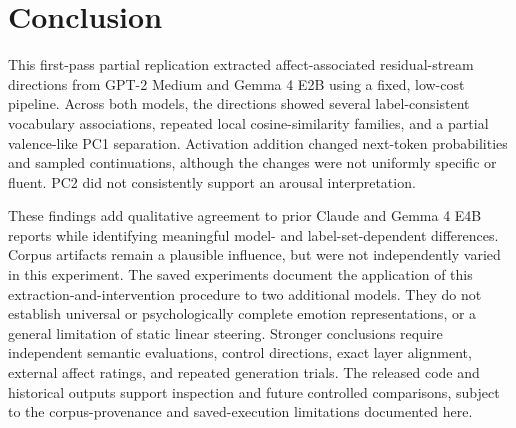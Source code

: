 \section{Conclusion}

This first-pass partial replication extracted affect-associated residual-stream directions from GPT-2 Medium and Gemma 4 E2B using 
a fixed, low-cost pipeline. Across both models, the directions showed several label-consistent vocabulary associations, repeated 
local cosine-similarity families, and a partial valence-like PC1 separation. Activation addition changed next-token probabilities 
and sampled continuations, although the changes were not uniformly specific or fluent. PC2 did not consistently support an arousal 
interpretation.

These findings add qualitative agreement to prior Claude and Gemma 4 E4B reports while identifying meaningful model- and label-set-dependent 
differences. Corpus artifacts remain a plausible influence, but were not independently varied in this experiment. The saved
experiments document the application of this extraction-and-intervention procedure to two additional models. They do not establish
universal or psychologically complete emotion representations, or a general limitation of static linear steering. Stronger
conclusions require independent semantic evaluations, control directions,
exact layer alignment, external affect ratings, and repeated generation trials. The released code and historical outputs support
inspection and future controlled comparisons, subject to the corpus-provenance and saved-execution limitations documented here.

